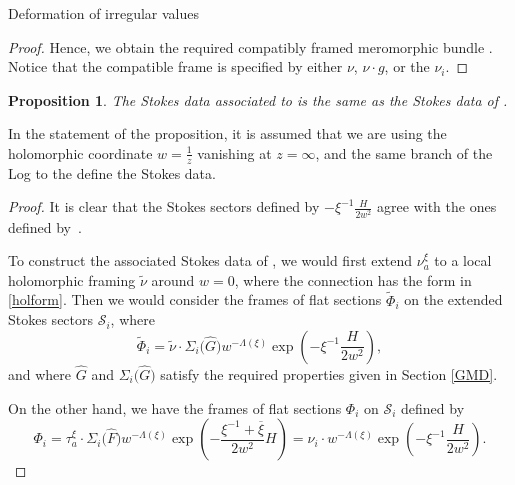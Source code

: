 \documentclass[11pt]{article}
\numberwithin{equation}{section}
\newtheorem{Proposition}[Theorem]{Proposition}
 { \theoremstyle{definition}
\newtheorem{Definition}[Theorem]{Definition}
\newtheorem{Notation}[Theorem]{Notation}
\newtheorem{Example}[Theorem]{Example}
\newtheorem{Remark}[Theorem]{Remark} }
\numberwithin{equation}{section}
\begin{document}
\begin{subsubsection}{Deformation of irregular values}
\begin{proof}
Hence, we obtain the required compatibly framed meromorphic bundle . Notice that the compatible frame is specified by either $\nu$, $\nu \cdot g$, or the $\nu_i$.
\end{proof}

\begin{Proposition}The Stokes data associated to  is the same as the Stokes data of .

\end{Proposition}
In the statement of the proposition, it is assumed that we are using the holomorphic coordinate $w=\frac{1}{z}$ vanishing at $z=\infty$, and the same branch of the Log to the define the Stokes data.

\begin{proof}
It is clear that the Stokes sectors defined by $-\xi^{-1}\frac{H}{2w^2}$ agree with the ones defined by~.

To construct the associated Stokes data of , we would first extend $\nu_a^{\xi}$ to a local holomorphic framing $\widetilde{\nu}$ around $w=0$, where the connection has the form in \eqref{holform}. Then we would consider the frames of flat sections $\widetilde{\Phi}_i$ on the extended Stokes sectors $\mathcal{S}_i$, where
\begin{equation*}
 \widetilde{\Phi}_i=\widetilde{\nu}\cdot \Sigma_i\bigl(\widehat{G}\bigr)w^{-\Lambda(\xi)}\exp \left(-\xi^{-1}\frac{H}{2w^2}\right),
\end{equation*}
and where $\widehat{G}$ and $\Sigma_i\bigl(\widehat{G}\bigr)$ satisfy the required properties given in Section \ref{GMD}.

On the other hand, we have the frames of flat sections $\Phi_i$ on $\mathcal{S}_i$ defined by
\begin{equation*}
 \Phi_i=\tau^{\xi}_a \cdot \Sigma_{i}\bigl(\widehat{F}\bigr)w^{-\Lambda(\xi)} \exp \left(-\frac{\xi^{-1}+\overline{\xi}}{2w^2}H\right)=\nu_{i}\cdot w^{-\Lambda(\xi)}\exp \left(-\xi^{-1}\frac{H}{2w^2}\right).
\end{equation*}


\end{proof}
\end{subsubsection}
\end{document}
